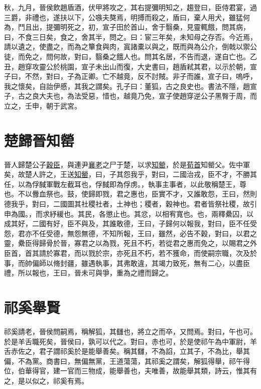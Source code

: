 \documentclass{article}
\newcommand{\tsu}{\small\kaishu\color{brown}}
\begin{document}
秋，九月，晉侯飲趙盾酒，伏甲將攻之，其右提彌明知之，趨登曰，臣侍君宴，過三爵，非禮也，遂扶以下，公嗾夫獒焉，明搏而殺之，盾曰，棄人用犬，雖猛何為，鬥且出，提彌明死之，初，宣子田於首山，舍于翳桑，見靈輒餓，問其病，曰，不食三日矣，食之，舍其半，問之。曰：宦三年矣，未知母之存否。今近焉，請以遺之，使盡之，而為之簞食與肉，寘諸橐以與之，既而與為公介，倒戟以禦公徒，而免之，問何故，對曰，翳桑之餓人也。問其名居，不告而退，遂自亡也。乙丑，趙穿攻靈公於桃園，宣子未出山而復，大史書曰，趙盾弒其君，以示於朝，宣子曰，不然，對曰，子為正卿。亡不越竟，反不討賊。非子而誰，宣子曰，嗚呼，我之懷矣，自詒伊慼，其我之謂矣。孔子曰：董狐，古之良史也。書法不隱，趙宣子，古之良大夫也，為法受惡，惜也，越竟乃免，宣子使趙穿逆公子黑臀于周，而立之，壬申，朝于武宮。

\section{楚歸晉知罃}

晉人歸楚公子\underline{穀臣}，與連尹\underline{襄老}之尸于楚，以求\underline{知罃}，於是\underline{荀首}{\tsu 知罃父。}佐中軍矣，故楚人許之，王送\underline{知罃}，曰，子其怨我乎，對曰，二國治戎，臣不才，不勝其任，以為俘馘{\tsu 軍戰左截耳也，俘馘即為俘虏。}，執事{\tsu 主事者，以此敬稱楚王，尊也。}不以釁{\tsu 血祭也。}鼓，使歸即戮，君之惠也，臣實不才，又誰敢怨，王曰，然則德我乎，對曰，二國圖其社稷{\tsu 社者，土神也；稷者，穀神也。君者皆祭社稷，故引申為國。}，而求紓{\tsu 緩也。}其民，各懲{\tsu 止也。}其忿，以相宥{\tsu 寬也。}也，兩釋纍囚，以成其好，二國有好，臣不與及，其誰敢德，王曰，子歸何以報我，對曰，臣不任受怨，君亦不任受德，無怨無德，不知所報，王曰，雖然，必告不穀，對曰，以君之靈，纍臣得歸骨於晉，寡君之以為戮，死且不朽，若從君之惠而免之，以賜君之外臣首，首其請於寡君，而以戮於宗，亦死且不朽，若不獲命，而使嗣宗職，次及於事，而帥偏師以脩封疆，雖遇執事，其弗敢違，其竭力致死，無有二心，以盡臣禮，所以報也，王曰，晉未可與爭，重為之禮而歸之。

\section{祁奚舉賢}

	
祁奚請老，晉侯問嗣焉，稱解狐，其讎也，將立之而卒，又問焉。對曰，午也可。於是羊舌職死矣，晉侯曰，孰可以代之。對曰，赤也可，於是使祁午為中軍尉，羊舌赤佐之，君子謂祁奚於是能舉善矣。稱其讎，不為諂，立其子，不為比，舉其偏，不為黨。商書曰，無偏無黨，王道蕩蕩，其祁奚之謂矣，解狐得舉，祁午得位，伯華得官，建一官而三物成，能舉善也，夫唯善，故能舉其類，詩云，惟其有之，是以似之，祁奚有焉。
\end{document}
